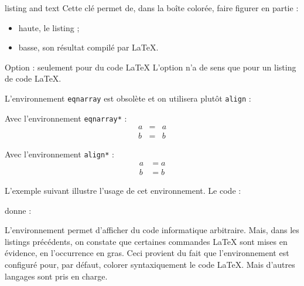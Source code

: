 \begin{docKey}{listing and text}{}{}
  Cette clé permet de, dans la boîte colorée, faire figurer en partie :
  \begin{itemize}
  \item haute, le listing ;
  \item basse, son résultat compilé par \LaTeX{}.
  \end{itemize}
  \begin{dbwarning}{Option \protect{} : seulement pour
      du code \LaTeX{}}{}
    L'option  n'a de sens que pour un listing de code
    \LaTeX{}.
  \end{dbwarning}
\end{docKey}

\begin{tcboutputlisting}
\begin{gztcode}
L'environnement \verb|eqnarray| est obsolète et on utilisera plutôt
\verb|align| :

\begin{minipage}[t]{0.4\linewidth}
  Avec l'environnement \verb|eqnarray*| :
  \begin{eqnarray*}
    a & = & a\\
    b & = & b
  \end{eqnarray*}
\end{minipage}
\hspace{1cm}
\begin{minipage}[t]{0.4\linewidth}
  Avec l'environnement \verb|align*| :
  \begin{align*}
    a & = a\\
    b & = b
  \end{align*}
\end{minipage}
\end{gztcode}
\end{tcboutputlisting}

L'exemple suivant illustre l'usage de cet environnement\conseilslatex{}. Le
code :


donne :



L'environnement  permet d'afficher du code informatique
arbitraire.  Mais, dans les listings précédents, on constate que certaines
commandes \LaTeX{} sont mises en évidence, en l'occurrence en gras. Ceci
provient du fait que l'environnement  est configuré pour, par
défaut, colorer syntaxiquement le code \LaTeX{}. Mais d'autres langages sont
pris en charge.


